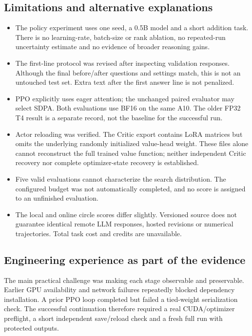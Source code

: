 \subsection{Limitations and alternative explanations}
\begin{itemize}
\item {} The policy experiment uses one seed, a 0.5B model and a short addition task. There is no learning-rate, batch-size or rank ablation, no repeated-run uncertainty estimate and no evidence of broader reasoning gains.
\item {} The first-line protocol was revised after inspecting validation responses. Although the final before/after questions and settings match, this is not an untouched test set. Extra text after the first answer line is not penalized.
\item {} PPO explicitly uses eager attention; the unchanged paired evaluator may select SDPA. Both evaluations use BF16 on the same A10. The older FP32 T4 result is a separate record, not the baseline for the successful run.
\item {} Actor reloading was verified. The Critic export contains LoRA matrices but omits the underlying randomly initialized value-head weight. These files alone cannot reconstruct the full trained value function; neither independent Critic recovery nor complete optimizer-state recovery is established.
\item {} Five valid evaluations cannot characterize the search distribution. The configured budget was not automatically completed, and no score is assigned to an unfinished evaluation.
\item {} The local and online circle scores differ slightly. Versioned source does not guarantee identical remote LLM responses, hosted revisions or numerical trajectories. Total task cost and credits are unavailable.
\end{itemize}

\subsection{Engineering experience as part of the evidence}
The main practical challenge was making each stage observable and preservable. Earlier GPU availability and network failures repeatedly blocked dependency installation. A prior PPO loop completed but failed a tied-weight serialization check. The successful continuation therefore required a real CUDA/optimizer preflight, a short independent save/reload check and a fresh full run with protected outputs.

